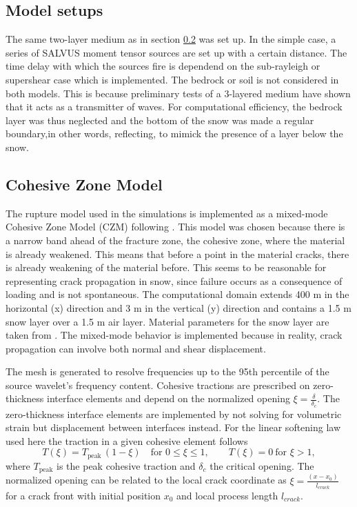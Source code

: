 \documentclass[10pt]{article}
\begin{document}
\subsection{Model setups}
\label{sec:simple model}
The same two-layer medium as in section \ref{sec:czm methods} was set up. In the simple case, a series of SALVUS moment tensor sources are set up with a certain distance. The time delay with which the sources fire is dependend on the sub-rayleigh or supershear case which is implemented. The bedrock or soil is not considered in both models. This is because preliminary tests of a 3-layered medium have shown that it acts as a transmitter of waves. For computational efficiency, the bedrock layer was thus neglected and the bottom of the snow was made a regular boundary,in other words, reflecting, to mimick the presence of a layer below the snow. 

\subsection{Cohesive Zone Model}
\label{sec:czm methods}

The rupture model used in the simulations is implemented as a mixed-mode Cohesive Zone Model (CZM) following \cite{mahajanModelingInterfacialCrack2008}. This model was chosen because there is a narrow band ahead of the fracture zone, the cohesive zone, where the material is already weakened. This means that before a point in the material cracks, there is already weakening of the material before. This seems to be reasonable for representing crack propagation in snow, since failure occurs as a consequence of loading and is not spontaneous. The computational domain extends 400 m in the horizontal (x) direction and 3 m in the vertical (y) direction and contains a 1.5 m snow layer over a 1.5 m air layer. Material parameters for the snow layer are taken from \cite{guillemotEffectSnowfallChanges2021}. The mixed-mode behavior is implemented because in reality, crack propagation can involve both normal and shear displacement.  \par

The mesh is generated to resolve frequencies up to the 95th percentile of the source wavelet's frequency content. Cohesive tractions are prescribed on zero-thickness interface elements and depend on the normalized opening \(\xi=\frac{\delta}{\delta_c}\). The zero-thickness interface elements are implemented by not solving for volumetric strain but displacement between interfaces instead. For the linear softening law used here the traction in a given cohesive element follows
\[ T(\xi) = T_\mathrm{peak}\,(1-\xi) \quad\text{for } 0\leq\xi\leq1,\qquad T(\xi)=0\ \text{for }\xi>1, \]
where \(T_\mathrm{peak}\) is the peak cohesive traction and \(\delta_c\) the critical opening. The normalized opening can be related to the local crack coordinate as \(\xi=\frac{(x-x_0)}{l_{crack}}\) for a crack front with initial position \(x_0\) and local process length \(l_{crack}\). \par
\end{document}
